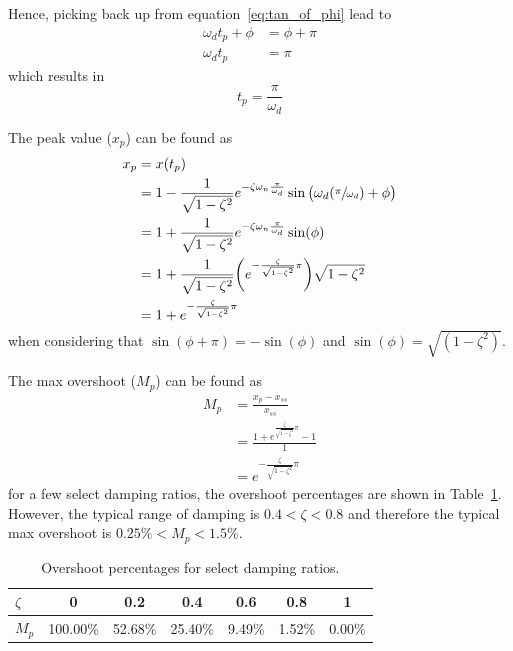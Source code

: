 \documentclass[12pt,letter]{article}
\begin{document}
\noindent Hence, picking back up from equation~\ref{eq:tan_of_phi} lead to
\begin{align}
\omega_d t_p + \phi &= \phi + \pi\\
\omega_d t_p &= \pi \nonumber 
\end{align}
which results in
\begin{equation}
t_p = \frac{\pi}{\omega_d}
\end{equation}



The peak value ($x_p$) can be found as
\begin{align}
x_p &= x(t_p) \\
&= 1 - \frac{1}{ \sqrt{1-\zeta^2}} e^{-\zeta \omega_n \frac{\pi}{\omega_d}} \sin\big(\omega_d (\sfrac{\pi}{\omega_d}) + \phi \big)\nonumber \\
&= 1 + \frac{1}{ \sqrt{1-\zeta^2}} e^{-\zeta \omega_n \frac{\pi}{\omega_d}} \sin(\phi)\nonumber \\
&= 1 + \frac{1}{ \sqrt{1-\zeta^2}} \bigg( e^{- \frac{\zeta}{\sqrt{1-\zeta^2}} \pi} \bigg) \sqrt{1-\zeta^2} \nonumber \\
&= 1 + e^{- \frac{\zeta}{\sqrt{1-\zeta^2}} \pi} \nonumber
\end{align}
when considering that $\sin(\phi + \pi) = -\sin(\phi)$ and $\sin(\phi) = \sqrt{(1-\zeta^2)}$.


The max overshoot ($M_p$) can be found as
\begin{align}
M_p &= \frac{x_p - x_{ss}}{x_{ss}} \\
&= \frac{1 + e^{\frac{\zeta}{\sqrt{1-\zeta^2}}\pi} -1 }{1} \nonumber \\
&= e^{- \frac{\zeta}{\sqrt{1-\zeta^2}} \pi } \nonumber 
\end{align}
for a few select damping ratios, the overshoot percentages are shown in Table~\ref{table:mp_and_damping_ratio}. However, the typical range of damping is $0.4 < \zeta < 0.8$ and therefore the typical max overshoot is $0.25\% < M_p < 1.5\%$.
\begin{table}[H]
\centering
\caption{Overshoot percentages for select damping ratios.}
\label{table:mp_and_damping_ratio}
\begin{tabular}{@{}lcccccc@{}}
\toprule
$\zeta$ & 0 & 0.2 & 0.4 & 0.6 & 0.8 & 1 \\ \midrule 
$M_p$ & 100.00\% & 52.68\% & 25.40\% & 9.49\% & 1.52\% & 0.00\% \\ \bottomrule
\end{tabular}
\end{table}
\end{document}

